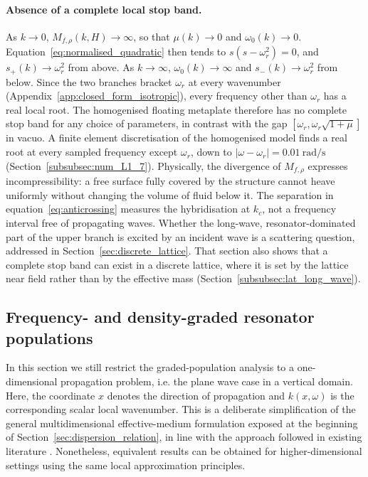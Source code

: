 {\paragraph{Absence of a complete local stop band.} As $k\to0$, $M_{f,\rho}(k,H)\to\infty$, so that $\mu(k)\to0$ and $\omega_0(k)\to0$. Equation~\eqref{eq:normalised_quadratic} then tends to $s(s-\omega_r^2)=0$, and $s_+(k)\to\omega_r^2$ from above. As $k\to\infty$, $\omega_0(k)\to\infty$ and $s_-(k)\to\omega_r^2$ from below. Since the two branches bracket $\omega_r$ at every wavenumber (Appendix~\ref{app:closed_form_isotropic}), every frequency other than $\omega_r$ has a real local root. The homogenised floating metaplate therefore has no complete stop band for any choice of parameters, in contrast with the gap $[\omega_r,\omega_r\sqrt{1+\mu}]$ in vacuo. {\color{red}A finite element discretisation of the homogenised model finds a real root at every sampled frequency except $\omega_r$, down to $|\omega-\omega_r|=0.01~\si{\radian\per\second}$ (Section~\ref{subsubsec:num_L1_7}).} Physically, the divergence of $M_{f,\rho}$ expresses incompressibility: a free surface fully covered by the structure cannot heave uniformly without changing the volume of fluid below it. The separation in equation~\eqref{eq:anticrossing} measures the hybridisation at $k_c$, not a frequency interval free of propagating waves. Whether the long-wave, resonator-dominated part of the upper branch is excited by an incident wave is a scattering question, addressed in Section~\ref{sec:discrete_lattice}. That section also shows that a complete stop band can exist in a discrete lattice, where it is set by the lattice near field rather than by the effective mass (Section~\ref{subsubsec:lat_long_wave}).
}

\subsection{Frequency- and density-graded resonator populations}\label{subsec:graded_resonators}
 
In this section we still restrict the graded-population analysis to a one-dimensional propagation problem, i.e. the plane wave case in a vertical domain. Here, the coordinate $x$ denotes the direction of propagation and $k(x,\omega)$ is the corresponding scalar local wavenumber. This is a deliberate simplification of the general multidimensional effective-medium formulation exposed at the beginning of Section~\ref{sec:dispersion_relation}, in line with the approach followed in existing literature \cite{liu2025metaplate,jin2026low}. Nonetheless, equivalent results can be obtained for higher-dimensional settings using the same local approximation principles.

